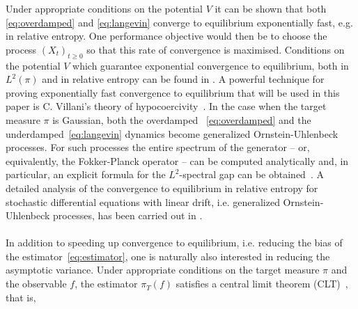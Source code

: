 Under appropriate conditions on the potential $V$ it can be shown that both \eqref{eq:overdamped} and \eqref{eq:langevin} converge to equilibrium exponentially fast, e.g. in relative entropy.  One performance objective would then be to choose the process $(X_t)_{t\ge0}$ so that this rate of convergence is maximised.
Conditions on the potential $V$ which guarantee exponential convergence to equilibrium, both in $L^{2}(\pi)$ and in relative entropy can be found in \cite{markowich2000trend,bakry2013analysis}. A powerful technique for proving exponentially fast convergence to equilibrium that will be used in this paper is C. Villani's theory of hypocoercivity~\cite{villani2009hypocoercivity}. In the case when the target measure $\pi$ is Gaussian, both the overdamped ~\eqref{eq:overdamped} and the underdamped~\eqref{eq:langevin} dynamics become generalized Ornstein-Uhlenbeck processes. For such processes the entire spectrum of the generator -- or, equivalently, the Fokker-Planck operator -- can be computed analytically and, in particular, an explicit formula for the $L^2$-spectral gap can be obtained~\cite{Metafune_formula,OPP12,OPP2015}.  A detailed analysis of the convergence to equilibrium in relative entropy for stochastic differential equations with linear drift, i.e. generalized Ornstein-Uhlenbeck processes, has been carried out in \cite{Arnold2014}. 
\\\\
In addition to speeding up convergence to equilibrium, i.e. reducing the bias of the estimator~\eqref{eq:estimator}, one is naturally also interested in reducing the asymptotic variance. Under appropriate conditions on the target measure $\pi$ and the observable $f$, the estimator $\pi_T(f)$ satisfies a central limit theorem (CLT)~\cite{KomorowskiLandimOlla2012}, that is,
